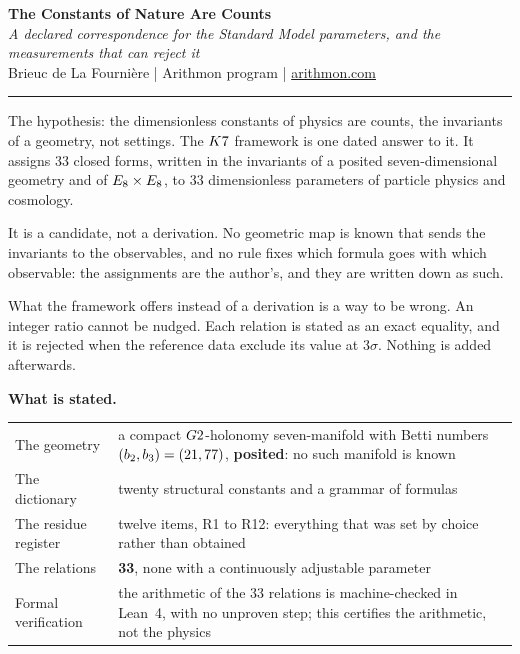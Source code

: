 \documentclass[10pt,a4paper]{article}
\begin{document}
\begin{center}
{\LARGE\textbf{The Constants of Nature Are Counts}}\\[0.4em]
{\normalsize\itshape A declared correspondence for the Standard Model
parameters, and the measurements that can reject it}\\[0.45em]
{\small Brieuc de La Fourni\`ere \quad | \quad Arithmon program \quad
| \quad \href{https://arithmon.com}{arithmon.com}}
\end{center}

\vspace{-0.3em}
\noindent\rule{\textwidth}{0.2pt}

{\small

The hypothesis: the dimensionless constants of physics are counts, the
invariants of a geometry, not settings. The $K7$ framework is one
dated answer to it. It assigns 33 closed forms, written in the invariants
of a posited seven-dimensional geometry and of $E_8 \times E_8$, to 33
dimensionless parameters of particle physics and cosmology.

It is a candidate, not a derivation. No geometric map is known that sends
the invariants to the observables, and no rule fixes which formula goes
with which observable: the assignments are the author's, and they are
written down as such.

What the framework offers instead of a derivation is a way to be wrong.
An integer ratio cannot be nudged. Each relation is stated as an exact
equality, and it is rejected when the reference data exclude its value at
$3\sigma$. Nothing is added afterwards.

\vspace{0.2em}
\noindent\textbf{What is stated.}
\begin{center}
\begin{tabular}{@{}p{}p{}@{}}
\toprule
The geometry & a compact $G2$-holonomy seven-manifold with Betti numbers $(b_2, b_3) = (21, 77)$, \textbf{posited}: no such manifold is known \\
The dictionary & twenty structural constants and a grammar of formulas \\
The residue register & twelve items, R1 to R12: everything that was set by choice rather than obtained \\
The relations & \textbf{33}, none with a continuously adjustable parameter \\
Formal verification & the arithmetic of the 33 relations is machine-checked in Lean~4, with no unproven step; this certifies the arithmetic, not the physics \\
\bottomrule
\end{tabular}
\end{center}

}
\end{document}
